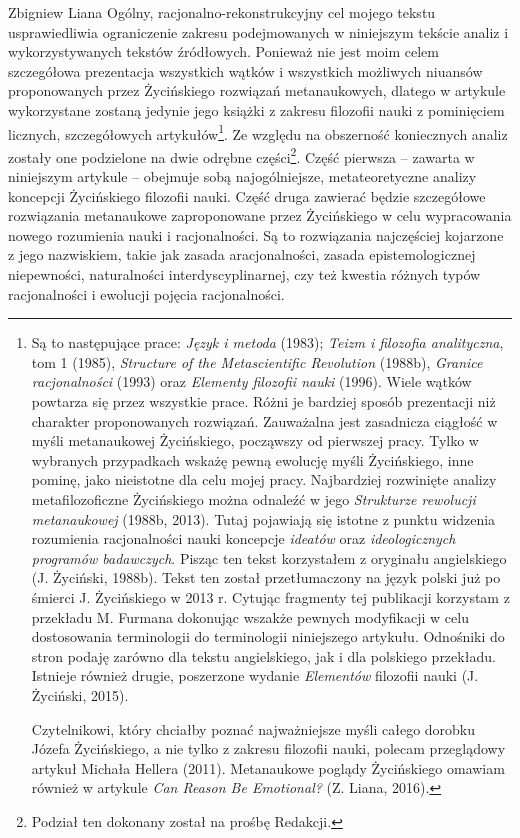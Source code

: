 \begin{artplenv}{Zbigniew Liana}
Ogólny, racjonalno-rekonstrukcyjny cel mojego tekstu usprawiedliwia ograniczenie zakresu podejmowanych w niniejszym
tekście analiz i wykorzystywanych tekstów źródłowych. Ponieważ nie jest moim celem szczegółowa prezentacja wszystkich
wątków i wszystkich możliwych niuansów proponowanych przez Życińskiego rozwiązań metanaukowych, dlatego w artykule
wykorzystane zostaną jedynie jego książki z zakresu filozofii nauki z pominięciem licznych, szczegółowych
artykułów\footnote{Są to następujące prace: \textit{Język i metoda} \label{ref:RND1LhiGh0y5p}(1983); \textit{Teizm i filozofia
analityczna}, tom 1 \label{ref:RND68nQZEVcjZ}(1985), \textit{Structure of the Metascientific Revolution}
\label{ref:RNDgXcIEkiEEw}(1988b), \textit{Granice racjonalności} \label{ref:RND9m82QoDque}(1993) oraz \textit{Elementy
filozofii nauki }\label{ref:RNDBnf6pOKYn0}(1996). Wiele wątków powtarza się przez wszystkie prace. Różni je bardziej
sposób prezentacji niż charakter proponowanych rozwiązań. Zauważalna jest zasadnicza ciągłość w myśli metanaukowej
Życińskiego, począwszy od pierwszej pracy. Tylko w wybranych przypadkach wskażę pewną ewolucję myśli Życińskiego, inne
pominę, jako nieistotne dla celu mojej pracy. Najbardziej rozwinięte analizy metafilozoficzne Życińskiego można
odnaleźć w jego \textit{Strukturze rewolucji metanaukowej} \label{ref:RNDPOjzmhEMek}(1988b, 2013). Tutaj pojawiają się
istotne z punktu widzenia rozumienia racjonalności nauki koncepcje \textit{ideatów} oraz \textit{ideologicznych programów
badawczych}. Pisząc ten tekst korzystałem z oryginału angielskiego \label{ref:RNDFZPJ2Z2OCH}(J. Życiński, 1988b). Tekst
ten został przetłumaczony na język polski już po śmierci J. Życińskiego w 2013 r. Cytując fragmenty tej publikacji
korzystam z przekładu M. Furmana dokonując wszakże pewnych modyfikacji w celu dostosowania terminologii do terminologii
niniejszego artykułu. Odnośniki do stron podaję zarówno dla tekstu angielskiego, jak i dla polskiego przekładu.
Istnieje również drugie, poszerzone wydanie \textit{Elementów} filozofii nauki \label{ref:RNDL62LQXHrez}(J. Życiński,
2015). \par Czytelnikowi, który chciałby poznać najważniejsze myśli całego dorobku Józefa Życińskiego, a nie tylko z zakresu
filozofii nauki, polecam przeglądowy artykuł Michała Hellera \label{ref:RNDeScsQTkW9D}(2011). Metanaukowe
poglądy Życińskiego omawiam również w artykule \textit{Can Reason Be Emotional?} \label{ref:RNDsr0gJlWoso}(Z. Liana,
2016).}. Ze względu na obszerność koniecznych analiz zostały one podzielone na dwie odrębne części\footnote{Podział ten
dokonany został na prośbę Redakcji.}. Część pierwsza -- zawarta w niniejszym artykule -- obejmuje sobą najogólniejsze,
metateoretyczne analizy koncepcji Życińskiego filozofii nauki. Część druga zawierać będzie szczegółowe rozwiązania
metanaukowe zaproponowane przez Życińskiego w celu wypracowania nowego rozumienia nauki i racjonalności. Są to
rozwiązania najczęściej kojarzone z jego nazwiskiem, takie jak zasada aracjonalności, zasada epistemologicznej
niepewności, naturalności interdyscyplinarnej, czy też kwestia różnych typów racjonalności i ewolucji pojęcia
racjonalności.


\end{artplenv}

